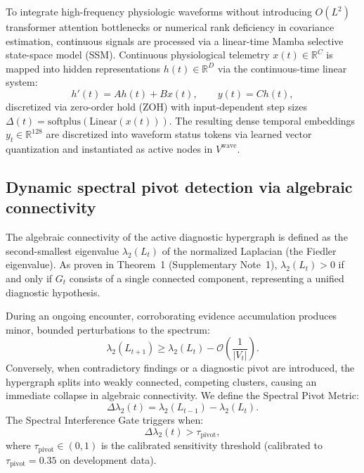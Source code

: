 \documentclass[12pt]{article}
\newcommand{\R}{\mathbb{R}}
\begin{document}
To integrate high-frequency physiologic waveforms without introducing $O(L^2)$ transformer attention bottlenecks or numerical rank deficiency in covariance estimation, continuous signals are processed via a linear-time Mamba selective state-space model (SSM)\cite{gu2023mamba}. Continuous physiological telemetry $x(t) \in \R^{C}$ is mapped into hidden representations $h(t) \in \R^{D}$ via the continuous-time linear system:
\begin{equation}
  h'(t) = A h(t) + B x(t), \qquad y(t) = C h(t),
\end{equation}
discretized via zero-order hold (ZOH) with input-dependent step sizes $\Delta(t) = \text{softplus}(\text{Linear}(x(t)))$. The resulting dense temporal embeddings $y_t \in \R^{128}$ are discretized into waveform status tokens via learned vector quantization and instantiated as active nodes in $V^{\text{wave}}$.

\subsection*{Dynamic spectral pivot detection via algebraic connectivity}

The algebraic connectivity of the active diagnostic hypergraph is defined as the second-smallest eigenvalue $\lambda_2(L_t)$ of the normalized Laplacian (the Fiedler eigenvalue)\cite{fiedler1973algebraic,belkin2003laplacian}. As proven in Theorem~1 (Supplementary Note~1), $\lambda_2(L_t) > 0$ if and only if $G_t$ consists of a single connected component, representing a unified diagnostic hypothesis.

During an ongoing encounter, corroborating evidence accumulation produces minor, bounded perturbations to the spectrum:
\begin{equation}
  \lambda_2(L_{t+1}) \ge \lambda_2(L_t) - \mathcal{O}\!\left(\frac{1}{|V_t|}\right).
\end{equation}
Conversely, when contradictory findings or a diagnostic pivot are introduced, the hypergraph splits into weakly connected, competing clusters, causing an immediate collapse in algebraic connectivity. We define the Spectral Pivot Metric:
\begin{equation}
  \Delta \lambda_2(t) = \lambda_2(L_{t-1}) - \lambda_2(L_t).
\end{equation}
The Spectral Interference Gate triggers when:
\begin{equation}
  \Delta \lambda_2(t) > \tau_{\text{pivot}},
  \label{eq:gate_trigger}
\end{equation}
where $\tau_{\text{pivot}} \in (0, 1)$ is the calibrated sensitivity threshold (calibrated to $\tau_{\text{pivot}} = 0.35$ on development data).
\end{document}

